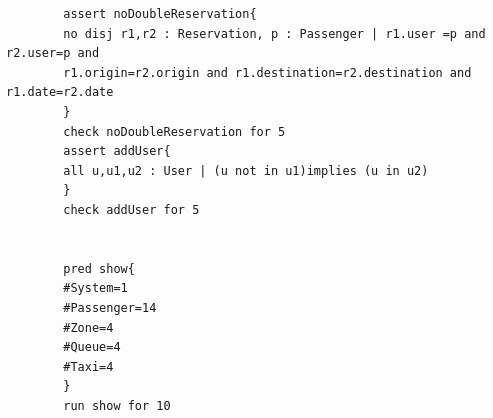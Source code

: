 \documentclass[11pt, a4paper,titlepage]{article}
\begin{document}
\begin{verbatim}
		assert noDoubleReservation{
		no disj r1,r2 : Reservation, p : Passenger | r1.user =p and r2.user=p and
		r1.origin=r2.origin and r1.destination=r2.destination and r1.date=r2.date
		}
		check noDoubleReservation for 5
		assert addUser{
		all u,u1,u2 : User | (u not in u1)implies (u in u2)
		}
		check addUser for 5
		
		
		pred show{
		#System=1
		#Passenger=14
		#Zone=4
		#Queue=4
		#Taxi=4
		}
		run show for 10
		
	\end{verbatim}
\end{document}
